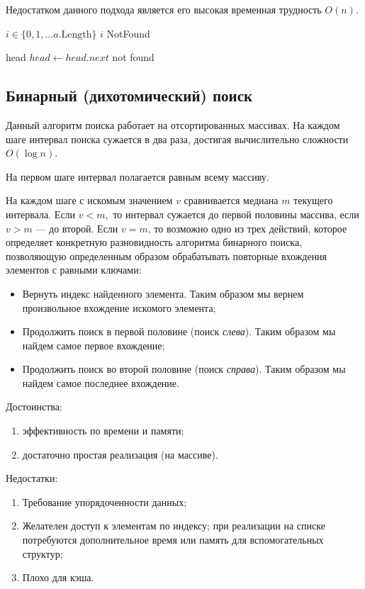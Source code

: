 Недостатком данного подхода является его высокая временная трудность $O(n)$.

\begin{algorithmic}
  \ForAll $i \in \{0, 1, \dots a.\textrm{Length}\}$
      \State \Return $i$
    \EndIf
  \EndFor
  \Return NotFound
\EndFunction

  \Repeat
      \State \Return head
    \EndIf
    $head \gets head.next$
  \Return not found
\EndFunction
\end{algorithmic}

\subsection{Бинарный (дихотомический) поиск}
Данный алгоритм поиска работает на отсортированных массивах. На каждом
шаге интервал поиска сужается в два раза, достигая вычислительно сложности $O(\log n)$.

На первом шаге интервал полагается равным всему массиву.

На каждом шаге с искомым значением $v$ сравнивается медиана $m$ текущего интервала.
Если $v < m,$ то интервал сужается до первой половины массива, если $v > m$ --- до второй.
Если $v = m$, то возможно одно из трех действий, которое определяет конкретную разновидность
алгоритма бинарного поиска, позволяющую определенным образом обрабатывать повторные
вхождения элементов с равными ключами:
\begin{itemize}
  \item Вернуть индекс найденного элемента. Таким образом мы вернем произвольное вхождение искомого элемента;
  \item Продолжить поиск в первой половине (поиск \textit{слева}). Таким образом мы найдем самое первое вхождение;
  \item Продолжить поиск во второй половине (поиск \textit{справа}). Таким образом мы найдем самое последнее вхождение.
\end{itemize}

Достоинства:
\begin{enumerate}
  \item эффективность по времени и памяти;
  \item достаточно простая реализация (на массиве).
\end{enumerate}
Недостатки:
\begin{enumerate}
  \item Требование упорядоченности данных;
  \item Желателен доступ к элементам по индексу; при реализации на
  списке потребуются дополнительное время или память для
  вспомогательных структур;
  \item Плохо для кэша.
\end{enumerate}

